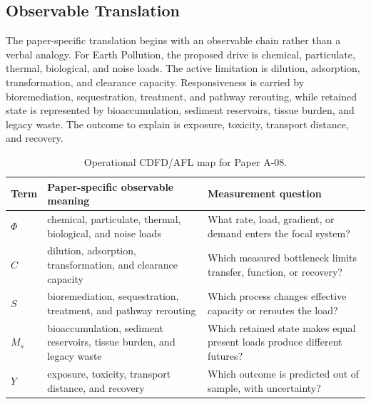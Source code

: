 \documentclass[11pt,a4paper]{article}
\begin{document}
\subsection{Observable Translation}

The paper-specific translation begins with an observable chain rather than a
verbal analogy. For Earth Pollution, the proposed drive is chemical, particulate, thermal, biological, and noise loads.
The active limitation is dilution, adsorption, transformation, and clearance capacity. Responsiveness is carried by
bioremediation, sequestration, treatment, and pathway rerouting, while retained state is represented by
bioaccumulation, sediment reservoirs, tissue burden, and legacy waste. The outcome to explain is exposure, toxicity, transport distance, and recovery.

\begin{table}[htbp]
\centering
\small
\caption{Operational CDFD/AFL map for Paper A-08.}
\begin{tabularx}{\textwidth}{|l|X|X|}
\hline
\textbf{Term} & \textbf{Paper-specific observable meaning} & \textbf{Measurement question} \\
\hline
$\Phi$ & chemical, particulate, thermal, biological, and noise loads & What rate, load, gradient, or demand enters the focal system? \\
\hline
$C$ & dilution, adsorption, transformation, and clearance capacity & Which measured bottleneck limits transfer, function, or recovery? \\
\hline
$S$ & bioremediation, sequestration, treatment, and pathway rerouting & Which process changes effective capacity or reroutes the load? \\
\hline
$M_s$ & bioaccumulation, sediment reservoirs, tissue burden, and legacy waste & Which retained state makes equal present loads produce different futures? \\
\hline
$Y$ & exposure, toxicity, transport distance, and recovery & Which outcome is predicted out of sample, with uncertainty? \\
\hline
\end{tabularx}
\end{table}
\end{document}
